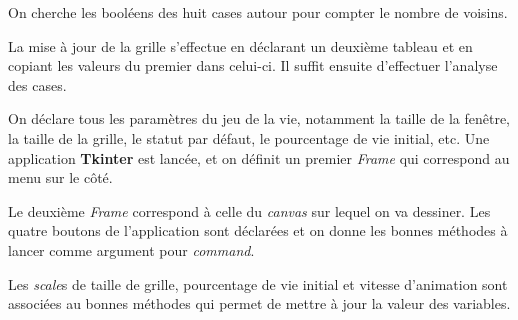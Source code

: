\documentclass[
	12pt, %
]{fphw}
\begin{document}
\begin{problem}
	
\end{problem}
On cherche les booléens des huit cases autour pour compter le nombre de voisins. 

\begin{problem}
	
\end{problem}
La mise à jour de la grille s'effectue en déclarant un deuxième tableau et en copiant les valeurs du premier dans celui-ci. 
Il suffit ensuite d'effectuer l'analyse des cases. 

\begin{problem}
	
\end{problem}
On déclare tous les paramètres du jeu de la vie, notamment la taille de la fenêtre, la taille de la grille, le statut par défaut, le pourcentage de vie initial, etc.
Une application \textbf{Tkinter} est lancée, et on définit un premier \textit{Frame} qui correspond au menu sur le côté. 

\begin{problem}
	
\end{problem}
Le deuxième \textit{Frame} correspond à celle du \textit{canvas} sur lequel on va dessiner. 
Les quatre boutons de l'application sont déclarées et on donne les bonnes méthodes à lancer comme argument pour \textit{command}.

\begin{problem}
	
\end{problem}
Les \textit{scale}s de taille de grille, pourcentage de vie initial et vitesse d'animation sont associées au bonnes méthodes qui permet de mettre à jour la valeur des variables. 
\end{document}
